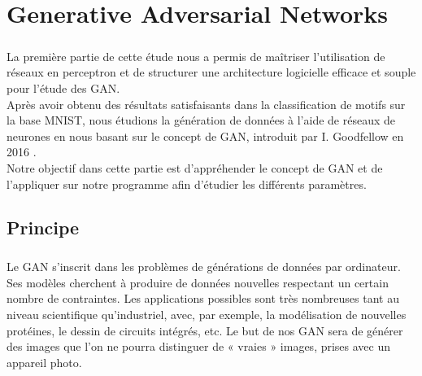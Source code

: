 

%

\chapter{Generative Adversarial Networks}

\paragraph{}
	La première partie de cette étude nous a permis de maîtriser l'utilisation de réseaux en perceptron et de structurer une architecture logicielle efficace et souple pour l'étude des GAN. \\
	Après avoir obtenu des résultats satisfaisants dans la classification de motifs sur la base MNIST, nous étudions la génération de données à l'aide de réseaux de neurones en nous basant sur le concept de GAN, introduit par I. Goodfellow en 2016 \cite{goodfellow_generative_2014}.\\
	Notre objectif dans cette partie est d’appréhender le concept de GAN et de l'appliquer sur notre programme afin d'étudier les différents paramètres. 
\section{Principe}
	\paragraph{}
		Le GAN s'inscrit dans les problèmes de générations de données par ordinateur. Ses modèles cherchent à produire de données nouvelles respectant un certain nombre de contraintes. Les applications possibles sont très nombreuses tant au niveau scientifique qu'industriel, avec, par exemple, la modélisation de nouvelles protéines, le dessin de circuits intégrés, etc. 
		Le but de nos GAN sera de générer des images que l’on ne pourra distinguer de « vraies » images, prises avec un appareil photo.\\

